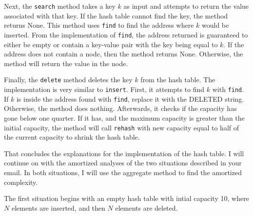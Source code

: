 \documentclass[11pt]{article}
\begin{document}
    Next, the \texttt{search} method takes a key \(k\) as input and attempts to return the value associated with that key. If the hash table cannot find the key, the method returns None. This method uses \texttt{find} to find the address where \(k\) would be inserted. From the implementation of \texttt{find}, the address returned is guaranteed to either be empty or contain a key-value pair with the key being equal to \(k\). If the address does not contain a node, then the method returns None. Otherwise, the method will return the value in the node.

    Finally, the \texttt{delete} method deletes the key \(k\) from the hash table. The implementation is very similar to \texttt{insert}. First, it attempts to find \(k\) with \texttt{find}. If \(k\) is inside the address found with \texttt{find}, replace it with the DELETED string. Otherwise, the method does nothing. Afterwards, it checks if the capacity has gone below one quarter. If it has, and the maximum capacity is greater than the initial capacity, the method will call \texttt{rehash} with new capacity equal to half of the current capacity to shrink the hash table.

    That concludes the explanations for the implementation of the hash table. I will continue on with the amortized analyses of the two situations described in your email. In both situations, I will use the aggregate method to find the amortized complexity.

    The first situation begins with an empty hash table with intial capacity 10, where \(N\) elements are inserted, and then \(N\) elements are deleted.
\end{document}
